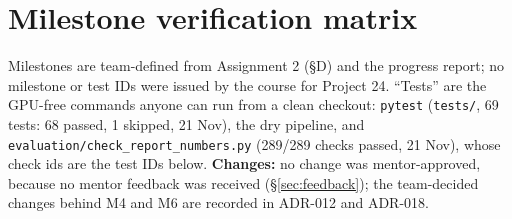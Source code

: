 \documentclass[10pt,a4paper]{article}
\newcommand{\fp}[1]{{\leavevmode\urlstyle{tt}\color{codecol}\nolinkurl{#1}}}
\begin{document}
\section{Milestone verification matrix}\label{sec:milestones}
Milestones are team-defined from Assignment 2 (\S D) and the progress report; no milestone or test IDs were issued
by the course for Project 24. ``Tests'' are the GPU-free commands anyone can run from a clean checkout: \texttt{pytest}
(\fp{tests/}, 69 tests: 68 passed, 1 skipped, 21 Nov), the dry pipeline, and \fp{evaluation/check_report_numbers.py}
(289/289 checks passed, 21 Nov), whose check ids are the test IDs below. \textbf{Changes:} no change was mentor-approved,
because no mentor feedback was received (\S\ref{sec:feedback}); the team-decided changes behind M4 and M6 are recorded in
ADR-012 and ADR-018.
\end{document}
